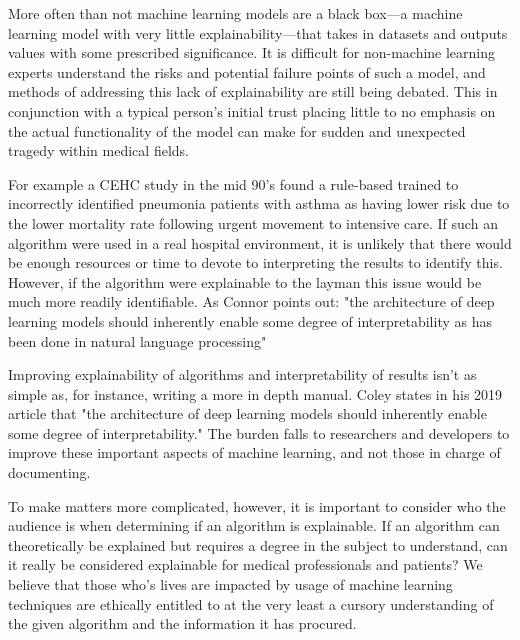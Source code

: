 \documentclass[]{article}
\begin{document}
			More often than not machine learning models are a black box---a machine learning model with very little explainability---that takes in datasets and outputs values with some prescribed significance. It is difficult for non-machine learning experts understand the risks and potential failure points of such a model, and methods of addressing this lack of explainability are still being debated.\cite{10.1145/2858036.2858529,10.1145/3328519.3329126} This in conjunction with a typical person's initial trust placing little to no emphasis on the actual functionality of the model\cite{siau2018building} can make for sudden and unexpected tragedy within medical fields.
			
			For example a CEHC study in the mid 90's found a rule-based trained to incorrectly identified pneumonia patients with asthma as having lower risk due to the lower mortality rate following urgent movement to intensive care.\cite{caruana2015intelligible} If such an algorithm were used in a real hospital environment, it is unlikely that there would be enough resources or time to devote to interpreting the results to identify this. However, if the algorithm were explainable to the layman this issue would be much more readily identifiable. As Connor points out: "the architecture of deep learning models should inherently enable some degree of interpretability as has been done in natural language processing"

			Improving explainability of algorithms and interpretability of results isn't as simple as, for instance, writing a more in depth manual. Coley states in his 2019 article that "the architecture of deep learning models should inherently enable some degree of interpretability."\cite{ColeyRSC} The burden falls to researchers and developers to improve these important aspects of machine learning, and not those in charge of documenting.
			
			To make matters more complicated, however, it is important to consider who the audience is when determining if an algorithm is explainable. If an algorithm can theoretically be explained but requires a degree in the subject to understand, can it really be considered explainable for medical professionals and patients? We believe that those who's lives are impacted by usage of machine learning techniques are ethically entitled to at the very least a cursory understanding of the given algorithm and the information it has procured.
\end{document}
